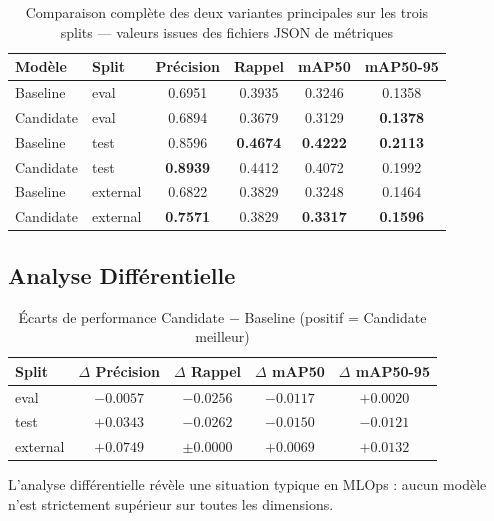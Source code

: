 \documentclass{rapportENSIAS}
\begin{document}
\begin{table}[H]
\centering
\caption{Comparaison complète des deux variantes principales sur les
         trois splits — valeurs issues des fichiers JSON de métriques}
\label{tab:comparaison_complete}
\begin{tabular}{llcccc}
\toprule
\textbf{Modèle} & \textbf{Split} & \textbf{Précision}
                & \textbf{Rappel} & \textbf{mAP50} & \textbf{mAP50-95} \\
\midrule
Baseline  & eval     & 0.6951 & 0.3935 & 0.3246 & 0.1358 \\
Candidate & eval     & 0.6894 & 0.3679 & 0.3129 & \textbf{0.1378} \\
\midrule
Baseline  & test     & 0.8596 & \textbf{0.4674} & \textbf{0.4222} & \textbf{0.2113} \\
Candidate & test     & \textbf{0.8939} & 0.4412 & 0.4072 & 0.1992 \\
\midrule
Baseline  & external & 0.6822 & 0.3829 & 0.3248 & 0.1464 \\
Candidate & external & \textbf{0.7571} & 0.3829 & \textbf{0.3317} & \textbf{0.1596} \\
\bottomrule
\end{tabular}
\end{table}

\subsection{Analyse Différentielle}

\begin{table}[H]
\centering
\caption{Écarts de performance Candidate $-$ Baseline (positif = Candidate meilleur)}
\label{tab:ecarts}
\begin{tabular}{lcccc}
\toprule
\textbf{Split} & \textbf{$\Delta$ Précision} & \textbf{$\Delta$ Rappel}
               & \textbf{$\Delta$ mAP50} & \textbf{$\Delta$ mAP50-95} \\
\midrule
eval     & $-0.0057$ & $-0.0256$ & $-0.0117$ & $+0.0020$ \\
test     & $+0.0343$ & $-0.0262$ & $-0.0150$ & $-0.0121$ \\
external & $+0.0749$ & $\pm0.0000$ & $+0.0069$ & $+0.0132$ \\
\bottomrule
\end{tabular}
\end{table}

L'analyse différentielle révèle une situation typique en MLOps :
aucun modèle n'est strictement supérieur sur toutes les dimensions.
\end{document}
